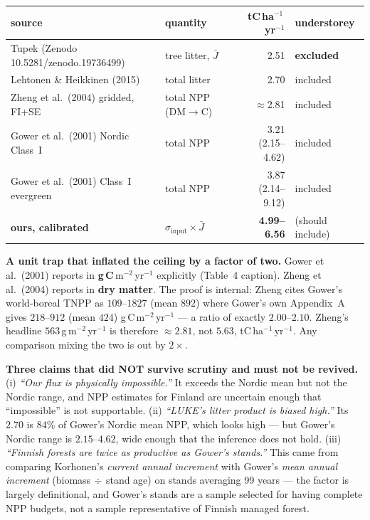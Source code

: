 \documentclass[11pt]{article}
\newcommand{\sinput}{\sigma_{\mathrm{input}}}
\begin{document}
\begin{center}\small
\begin{tabular}{@{}llrl@{}}
\toprule
source & quantity & tC\,ha$^{-1}$\,yr$^{-1}$ & understorey \\
\midrule
Tupek (Zenodo 10.5281/zenodo.19736499) & tree litter, $\bar{J}$ & 2.51 & \textbf{excluded} \\
Lehtonen \& Heikkinen (2015) & total litter & 2.70 & included \\
Zheng et al.\ (2004) gridded, FI+SE & total NPP (DM$\to$C) & $\approx$2.81 & included \\
Gower et al.\ (2001) Nordic Class~I & total NPP & 3.21 (2.15--4.62) & included \\
Gower et al.\ (2001) Class~I evergreen & total NPP & 3.87 (2.14--9.12) & included \\
\midrule
\textbf{ours, calibrated} & $\sinput\times\bar{J}$ & \textbf{4.99--6.56} & (should include) \\
\bottomrule
\end{tabular}
\end{center}

\begin{caveat}
\textbf{A unit trap that inflated the ceiling by a factor of two.} Gower et al.\ (2001) reports in
\textbf{g\,C}\,m$^{-2}$\,yr$^{-1}$ explicitly (Table~4 caption). Zheng et al.\ (2004) reports in
\textbf{dry matter}. The proof is internal: Zheng cites Gower's world-boreal TNPP as
$109$--$1827$ (mean $892$) where Gower's own Appendix~A gives $218$--$912$ (mean $424$)
g\,C\,m$^{-2}$\,yr$^{-1}$ --- a ratio of exactly $2.00$--$2.10$. Zheng's headline
$563$\,g\,m$^{-2}$\,yr$^{-1}$ is therefore $\approx2.81$, not $5.63$, tC\,ha$^{-1}$\,yr$^{-1}$.
Any comparison mixing the two is out by $2\times$.
\end{caveat}

\begin{caveat}
\textbf{Three claims that did NOT survive scrutiny and must not be revived.}
(i) \emph{``Our flux is physically impossible.''} It exceeds the Nordic mean but not the Nordic
range, and NPP estimates for Finland are uncertain enough that ``impossible'' is not supportable.
(ii) \emph{``LUKE's litter product is biased high.''} Its $2.70$ is $84\%$ of Gower's Nordic mean
NPP, which looks high --- but Gower's Nordic range is $2.15$--$4.62$, wide enough that the
inference does not hold. (iii) \emph{``Finnish forests are twice as productive as Gower's
stands.''} This came from comparing Korhonen's \emph{current annual increment} with Gower's
\emph{mean annual increment} (biomass$\,\div\,$stand age) on stands averaging 99 years --- the
factor is largely definitional, and Gower's stands are a sample selected for having complete NPP
budgets, not a sample representative of Finnish managed forest.
\end{caveat}
\end{document}
